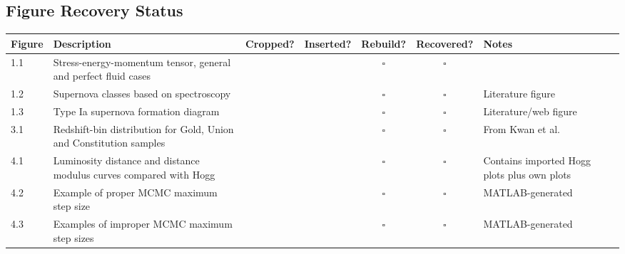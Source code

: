 \documentclass{article}
\newcommand{\done}{\textcolor{green!60!black}{\ding{51}}}
\newcommand{\pending}{$\square$}
\begin{document}
\subsection{Figure Recovery Status}

\begin{longtable}{|l|p{4.5cm}|c|c|c|c|p{3cm}|}
\hline
Figure &
Description &
Cropped? &
Inserted? &
Rebuild? &
Recovered? &
Notes \\
\hline
\endhead

1.1 & Stress-energy-momentum tensor, general and perfect fluid cases & \done & \done & \pending & \pending & \\
1.2 & Supernova classes based on spectroscopy & \done & \done & \pending & \pending & Literature figure \\
1.3 & Type Ia supernova formation diagram & \done & \done & \pending & \pending & Literature/web figure \\

3.1 & Redshift-bin distribution for Gold, Union and Constitution samples & \done & \done & \pending & \pending & From Kwan et al. \\

4.1 & Luminosity distance and distance modulus curves compared with Hogg & \done & \done & \pending & \pending &  Contains imported Hogg plots plus own plots \\
4.2 & Example of proper MCMC maximum step size & \done & \done & \pending & \pending &  MATLAB-generated \\
4.3 & Examples of improper MCMC maximum step sizes & \done & \done & \pending & \pending &  MATLAB-generated \\


\end{longtable}
\end{document}
